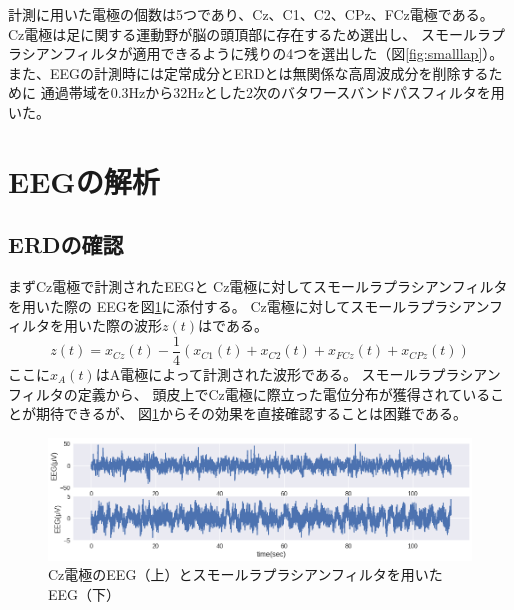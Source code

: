 計測に用いた電極の個数は5つであり、Cz、C1、C2、CPz、FCz電極である。
Cz電極は足に関する運動野が脳の頭頂部に存在するため選出し、
スモールラプラシアンフィルタが適用できるように残りの4つを選出した（図\ref{fig:smalllap}）。
また、EEGの計測時には定常成分とERDとは無関係な高周波成分を削除するために
通過帯域を0.3Hzから32Hzとした2次のバタワースバンドパスフィルタを用いた。

\section{EEGの解析}
\subsection{ERDの確認}
まずCz電極で計測されたEEGと
Cz電極に対してスモールラプラシアンフィルタを用いた際の
EEGを図\ref{fig:eegsub1}に添付する。
Cz電極に対してスモールラプラシアンフィルタを用いた際の波形\(z(t)\)はである。
\begin{equation}
    z(t) = x_{Cz}(t) - \frac{1}{4}(x_{C1}(t) + x_{C2}(t) + x_{FCz}(t) + x_{CPz}(t))
\end{equation}
ここに\(x_{A}(t)\)はA電極によって計測された波形である。
スモールラプラシアンフィルタの定義から、
頭皮上でCz電極に際立った電位分布が獲得されていることが期待できるが、
図\ref{fig:eegsub1}からその効果を直接確認することは困難である。

\begin{figure}
    \centering
    \includegraphics[width=13cm]{images/eeg_sub1.png}
    \caption{Cz電極のEEG（上）とスモールラプラシアンフィルタを用いたEEG（下）}
    \label{fig:eegsub1}
\end{figure}


